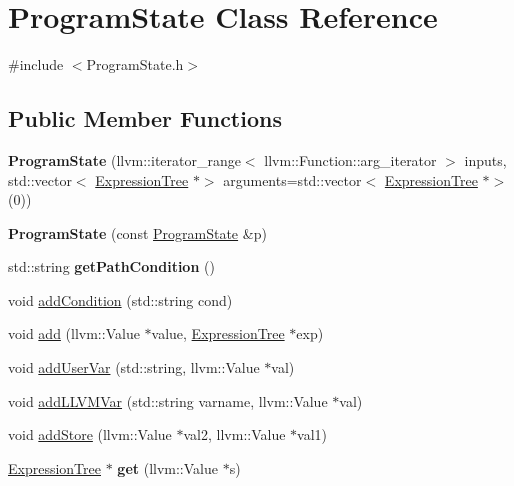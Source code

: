 \hypertarget{classProgramState}{}\section{Program\+State Class Reference}
\label{classProgramState}


{\ttfamily \#include $<$Program\+State.\+h$>$}

\subsection*{Public Member Functions}
\begin{DoxyCompactItemize}
\item 
{\bfseries Program\+State} (llvm\+::iterator\+\_\+range$<$ llvm\+::\+Function\+::arg\+\_\+iterator $>$ inputs, std\+::vector$<$ \hyperlink{classExpressionTree}{Expression\+Tree} $\ast$$>$ arguments=std\+::vector$<$ \hyperlink{classExpressionTree}{Expression\+Tree} $\ast$$>$(0))\hypertarget{classProgramState_af5a4a34abfea9c877a3b579a0738a92f}{}\label{classProgramState_af5a4a34abfea9c877a3b579a0738a92f}

\item 
{\bfseries Program\+State} (const \hyperlink{classProgramState}{Program\+State} \&p)\hypertarget{classProgramState_a4e8d27974f8d4094751f3f9f17860cd7}{}\label{classProgramState_a4e8d27974f8d4094751f3f9f17860cd7}

\item 
std\+::string {\bfseries get\+Path\+Condition} ()\hypertarget{classProgramState_a8884dd13979ab4ea6cc2f244d3027b1d}{}\label{classProgramState_a8884dd13979ab4ea6cc2f244d3027b1d}

\item 
void \hyperlink{classProgramState_a7918e477f448c4401ed69df5cee92eab}{add\+Condition} (std\+::string cond)
\item 
void \hyperlink{classProgramState_a7d5bd2ba59b9a8b55e0edfdbb4f1761a}{add} (llvm\+::\+Value $\ast$value, \hyperlink{classExpressionTree}{Expression\+Tree} $\ast$exp)
\item 
void \hyperlink{classProgramState_a316f476c1fd7735f4519ab5f468facf1}{add\+User\+Var} (std\+::string, llvm\+::\+Value $\ast$val)
\item 
void \hyperlink{classProgramState_a36ff0ef68b34393bf757fc666fcbdb0b}{add\+L\+L\+V\+M\+Var} (std\+::string varname, llvm\+::\+Value $\ast$val)
\item 
void \hyperlink{classProgramState_a4332267b0a34ffc0a22de872e93246b0}{add\+Store} (llvm\+::\+Value $\ast$val2, llvm\+::\+Value $\ast$val1)
\item 
\hyperlink{classExpressionTree}{Expression\+Tree} $\ast$ {\bfseries get} (llvm\+::\+Value $\ast$s)\hypertarget{classProgramState_ada4631cb21aa6d357c514b9aab370941}{}\label{classProgramState_ada4631cb21aa6d357c514b9aab370941}


\end{DoxyCompactItemize}
